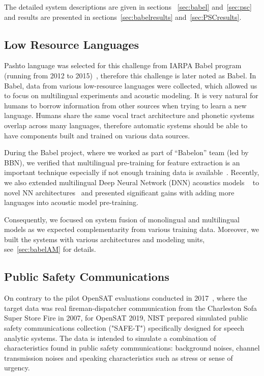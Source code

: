 \documentclass{article}
\begin{document}
The detailed system
descriptions are given in sections ~\ref{sec:babel} and~\ref{sec:psc} and
results are presented in sections~\ref{sec:babelresults} and~\ref{sec:PSCresults}.




\subsection{Low Resource Languages}
Pashto language was selected for this challenge from 
IARPA Babel program (running from 2012 to 2015)~\cite{harper:ASRU:2013}, therefore this challenge
is later noted as Babel. 
In Babel, data from various low-resource
languages were collected, which allowed us to focus on multilingual 
experiments and acoustic
modeling. It is very natural for humans to borrow information from other
sources when trying to learn a new language. Humans
share the same vocal tract architecture and phonetic systems overlap across many
languages, therefore automatic
systems should be able to have components built and trained on
various data sources.

During the Babel project, where we worked as part of ``Babelon'' team (led by BBN), we verified that multilingual pre-training for feature extraction  is an important
technique especially if not enough training data is available~\cite{grezl:SLTU:2014:BNmultNN}. 
Recently, we also extended multilingual Deep Neural Network (DNN) acoustics models
~\cite{ghoshal:ICASSP:2013:MultilingDNN} to 
novel NN architectures~\cite{karafiat:IS:2017:MultBLSTM} and
presented significant gains with adding more languages into acoustic
model pre-training. 

Consequently, we focused on system fusion of monolingual and multilingual models as we expected complementarity
from various training data. Moreover, we built the systems with various architectures and modeling units, see~\ref{sec:babelAM} for details. 




\subsection{Public Safety Communications}
On contrary to the pilot OpenSAT evaluations conducted in
2017~\cite{karafiat:IS:2018:OpenSAT}, where the target data was real
fireman-dispatcher communication  from the Charleston Sofa Super Store
Fire in 2007, for OpenSAT 2019, NIST prepared simulated public safety communications collection ("SAFE-T") specifically designed for speech analytic systems. The data is
intended to simulate a combination of characteristics found in public
safety communications: background noises, channel transmission noises and
speaking characteristics such as stress or sense of urgency.
\end{document}

